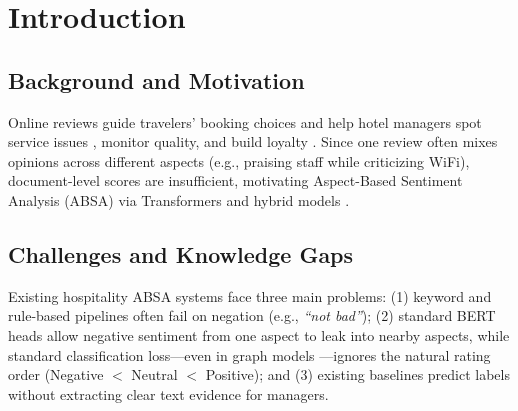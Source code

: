 \documentclass[pdflatex,sn-mathphys-num]{sn-jnl}%
\theoremstyle{thmstyleone}%
\theoremstyle{thmstyletwo}%
\theoremstyle{thmstylethree}%
\begin{document}

\maketitle

\nocite{ref01_bimaputra2023,ref02_bruni2025,ref03_nakamura2021,ref04_namee2023,ref05_nawawi2024,ref06_yu2024,ref07_apriliani2020,ref08_ounacer2023,ref09_nadeem2025,ref10_nguyen2023,ref11_sutherland2020,ref12_nam2021,ref13_zhang2022,ref14_jeong2024,ref15_pang2025,ref16_shin2024,ref17_perdomo2026,ref18_brauwers2022,ref19_tahir2024,ref20_vo2022,ref21_llorens2023,ref22_aransyah2026,ref23_lewis2020,ref24_reimers2019,ref25_le2026,ref26_piriyakul2024,ref27_alghuribi2025,ref28_xia2026,ref29_jayanto2022,ref30_tran2026}

\section{Introduction}
\label{sec:introduction}

\subsection{Background and Motivation}
\label{subsec:background}
Online reviews guide travelers' booking choices \cite{ref20_vo2022} and help hotel managers spot service issues \cite{ref21_llorens2023}, monitor quality, and build loyalty \cite{ref19_tahir2024,ref26_piriyakul2024}. Since one review often mixes opinions across different aspects (e.g., praising staff while criticizing WiFi), document-level scores are insufficient, motivating Aspect-Based Sentiment Analysis (ABSA) via Transformers \cite{ref01_bimaputra2023} and hybrid models \cite{ref04_namee2023}.

\subsection{Challenges and Knowledge Gaps}
\label{subsec:problem}
Existing hospitality ABSA systems face three main problems: (1) keyword and rule-based pipelines \cite{ref04_namee2023} often fail on negation (e.g., \textit{``not bad''}); (2) standard BERT heads \cite{ref01_bimaputra2023} allow negative sentiment from one aspect to leak into nearby aspects, while standard classification loss---even in graph models \cite{ref09_nadeem2025}---ignores the natural rating order (Negative $<$ Neutral $<$ Positive); and (3) existing baselines \cite{ref01_bimaputra2023,ref04_namee2023,ref09_nadeem2025} predict labels without extracting clear text evidence for managers.
\end{document}
